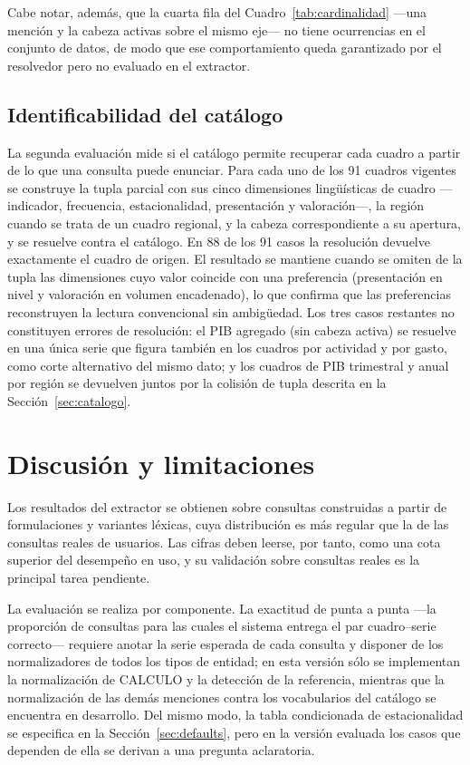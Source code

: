 \documentclass[11pt]{article}
\begin{document}
Cabe notar, además, que la cuarta fila del Cuadro~\ref{tab:cardinalidad} ---una
mención y la cabeza activas sobre el mismo eje--- no tiene ocurrencias en el
conjunto de datos, de modo que ese comportamiento queda garantizado por el
resolvedor pero no evaluado en el extractor.

\subsection{Identificabilidad del catálogo}

La segunda evaluación mide si el catálogo permite recuperar cada cuadro a partir
de lo que una consulta puede enunciar. Para cada uno de los 91 cuadros vigentes se
construye la tupla parcial con sus cinco dimensiones lingüísticas de cuadro
---indicador, frecuencia, estacionalidad, presentación y valoración---, la región
cuando se trata de un cuadro regional, y la cabeza correspondiente a su apertura,
y se resuelve contra el catálogo. En 88 de los 91 casos la resolución devuelve
exactamente el cuadro de origen. El resultado se mantiene cuando se omiten de la
tupla las dimensiones cuyo valor coincide con una preferencia (presentación en
nivel y valoración en volumen encadenado), lo que confirma que las preferencias
reconstruyen la lectura convencional sin ambigüedad. Los tres casos restantes no
constituyen errores de resolución: el PIB agregado (sin cabeza activa) se
resuelve en una única serie que figura también en los cuadros por actividad y por
gasto, como corte alternativo del mismo dato; y los cuadros de PIB trimestral y
anual por región se devuelven juntos por la colisión de tupla descrita en la
Sección~\ref{sec:catalogo}.

\section{Discusión y limitaciones}
\label{sec:discusion}

Los resultados del extractor se obtienen sobre consultas construidas a partir de
formulaciones y variantes léxicas, cuya distribución es más regular que la de las
consultas reales de usuarios. Las cifras deben leerse, por tanto, como una cota
superior del desempeño en uso, y su validación sobre consultas reales es la
principal tarea pendiente.

La evaluación se realiza por componente. La exactitud de punta a punta ---la
proporción de consultas para las cuales el sistema entrega el par cuadro--serie
correcto--- requiere anotar la serie esperada de cada consulta y disponer de los
normalizadores de todos los tipos de entidad; en esta versión sólo se implementan
la normalización de CALCULO y la detección de la referencia, mientras que la
normalización de las demás menciones contra los vocabularios del catálogo se
encuentra en desarrollo. Del mismo modo, la tabla condicionada de estacionalidad
se especifica en la Sección~\ref{sec:defaults}, pero en la versión evaluada los
casos que dependen de ella se derivan a una pregunta aclaratoria.
\end{document}
